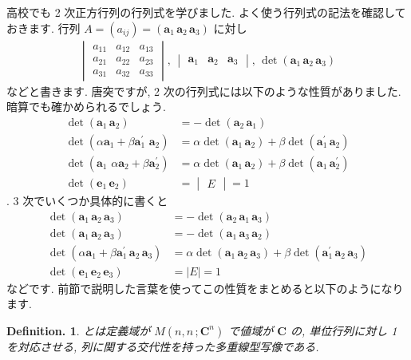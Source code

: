 \documentclass[openany, a4paper, oneside]{book}
\theoremstyle{break}
\theoremstyle{breakdefn}
\newtheorem{defn}[thm]{Definition.}
\begin{document}
高校でも 2 次正方行列の行列式を学びました. よく使う行列式の記法を確認しておきます.
行列 $A = (a_{ij}) = (\bm{a}_{1}\, \bm{a}_{2} \, \bm{a}_{3})$ に対し
\begin{align}
 \begin{vmatrix} a_{11} & a_{12} & a_{13} \\ a_{21} & a_{22} & a_{23} \\ a_{31} & a_{32} & a_{33} \end{vmatrix} , \,
 \begin{vmatrix} \bm{a}_{1} & \bm{a}_{2} & \bm{a}_{3} \end{vmatrix} ,\,
 \det \left ( \bm{a}_{1} \, \bm{a}_{2} \, \bm{a}_{3} \right)
\end{align}
などと書きます. 唐突ですが, 2 次の行列式には以下のような性質がありました.
暗算でも確かめられるでしょう.
\begin{align}
 \det \left ( \bm{a}_{1} \, \bm{a}_{2} \right)
 &= - \det \left ( \bm{a}_{2} \, \bm{a}_{1} \right) \\
 \det \left ( \alpha \bm{a}_{1} + \beta \bm{a}^{'}_{1}  \,\, \bm{a}_{2} \right)
 &= \alpha \det \left ( \bm{a}_{1} \, \bm{a}_{2} \right)
 +\beta \det \left (  \bm{a}^{'}_{1}  \, \bm{a}_{2} \right) \\
 \det \left ( \bm{a}_{1} \,\, \alpha \bm{a}_{2} + \beta \bm{a}^{'}_{2}  \right)
 &= \alpha \det \left ( \bm{a}_{1} \, \bm{a}_{2} \right) + \beta \det \left (  \bm{a}_{1}  \, \bm{a}^{'}_{2} \right) \\
 \det \left ( \bm{e}_{1} \, \bm{e}_{2} \right) &= \begin{vmatrix} E \end{vmatrix} = 1
\end{align}
. 3 次でいくつか具体的に書くと
\begin{align}
 \det \left ( \bm{a}_{1} \, \bm{a}_{2} \, \bm{a}_{3} \right)
 &= - \det \left ( \bm{a}_{2} \, \bm{a}_{1} \, \bm{a}_{3} \right) \\
 \det \left ( \bm{a}_{1} \, \bm{a}_{2} \, \bm{a}_{3} \right)
 &= - \det \left ( \bm{a}_{1} \, \bm{a}_{3} \, \bm{a}_{2} \right) \\
 \det \left ( \alpha \bm{a}_{1} + \beta \bm{a}^{'}_{1}  \, \bm{a}_{2}  \, \bm{a}_{3} \right)
 &=
 \alpha \det \left ( \bm{a}_{1} \, \bm{a}_{2} \, \bm{a}_{3} \right)
 +\beta \det \left (  \bm{a}^{'}_{1}  \, \bm{a}_{2} \, \bm{a}_{3} \right) \\
 \det \left ( \bm{e}_{1} \, \bm{e}_{2} \, \bm{e}_{3} \right) &= \mid E \mid = 1
\end{align}
などです.
前節で説明した言葉を使ってこの性質をまとめると以下のようになります.
\begin{defn}
 とは定義域が $M \left ( n,n \, ; \bm{C}^n \right)$ で値域が $\bm{C}$ の,
 単位行列に対し 1 を対応させる, 列に関する交代性を持った多重線型写像である.
\end{defn}
\end{document}
